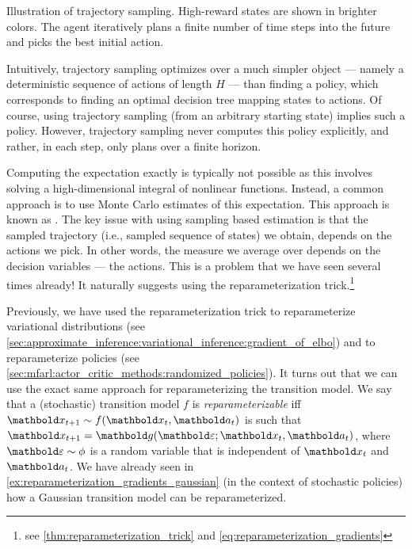 \begin{marginfigure}
  \caption{Illustration of trajectory sampling.
  High-reward states are shown in brighter colors.
  The agent iteratively plans a finite number of time steps into the future and picks the best initial action.}
\end{marginfigure}

Intuitively, trajectory sampling optimizes over a much simpler object --- namely a deterministic sequence of actions of length $H$ --- than finding a policy, which corresponds to finding an optimal decision tree mapping states to actions.
Of course, using trajectory sampling (from an arbitrary starting state) implies such a policy.
However, trajectory sampling never computes this policy explicitly, and rather, in each step, only plans over a finite horizon.

Computing the expectation exactly is typically not possible as this involves solving a high-dimensional integral of nonlinear functions.
Instead, a common approach is to use Monte Carlo estimates of this expectation.
This approach is known as .
The key issue with using sampling based estimation is that the sampled trajectory (i.e., sampled sequence of states) we obtain, depends on the actions we pick.
In other words, the measure we average over depends on the decision variables --- the actions.
This is a problem that we have seen several times already!
It naturally suggests using the reparameterization trick.\footnote{see \cref{thm:reparameterization_trick} and \cref{eq:reparameterization_gradients}}

Previously, we have used the reparameterization trick to reparameterize variational distributions (see \cref{sec:approximate_inference:variational_inference:gradient_of_elbo}) and to reparameterize policies (see \cref{sec:mfarl:actor_critic_methods:randomized_policies}).
It turns out that we can use the exact same approach for reparameterizing the transition model.
We say that a (stochastic) transition model $f$ is \emph{reparameterizable} iff $\vx_{t+1} \sim f(\vx_t, \va_t)$ is such that $\vx_{t+1} = \vg(\vvarepsilon; \vx_t, \va_t)$, where $\vvarepsilon \sim \phi$ is a random variable that is independent of $\vx_t$ and $\va_t$.
We have already seen in \cref{ex:reparameterization_gradients_gaussian} (in the context of stochastic policies) how a Gaussian transition model can be reparameterized.


